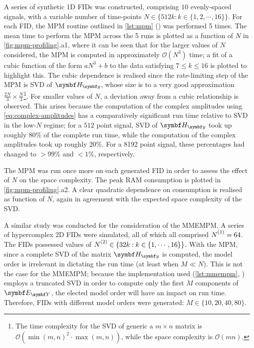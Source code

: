 A series of synthetic \ac{1D} \acp{FID} was constructed, comprising $10$ evenly-spaced
signals, with a
variable number of time-points $N \in \lbrace 512k : k \in \lbrace 1, 2, \cdots, 16 \rbrace \rbrace$.
For each \ac{FID}, the \ac{MPM} routine outlined in \cref{lst:mpm} () was
performed 5 times.
The mean time to perform the \ac{MPM} across the 5 runs is plotted as a function
of $N$ in \cref{fig:mpm-profiling}.a1, where it can be seen that for
the larger values of $N$ considered, the \ac{MPM} is computed in approximately
$\mathcal{O}({N}^3)$ time;
a fit of a cubic function of the form $aN^3 + b$ to the data satisfying $7 \leq
k \leq 16$ is plotted to highlight this.
The cubic dependence is realised since the rate-limiting step of the
\ac{MPM} is \ac{SVD} of $\Hy$, whose size is to a very good approximation
$\tfrac{2N}{3} \times \tfrac{N}{3}$\footnote{
    \label{fn:svd-complexity}
    The time complexity for the \ac{SVD} of generic a $m \times n$ matrix is
    $\mathcal{O}(\operatorname{min}(m, n)^2 \cdot \operatorname{max}(m, n))$,
    while the space complexity is $\mathcal{O}(mn)$.
}. For smaller values of $N$, a deviation
away from a cubic relationship is observed.
This arises because the computation of the complex amplitudes using
\cref{eq:complex-amplitudes} has a comparatively significant run time
relative to \ac{SVD} in the low-$N$ regime;
for a $512$ point signal, \ac{SVD} of $\Hy$ took up roughly 80\% of the
complete run time, while the computation of the complex amplitudes took up
roughly 20\%. For a 8192 point signal, these percentages had changed to
$>\!\!99\%$ and $<\!\!1\%$, respectively.

The \ac{MPM} was run once more on each generated \ac{FID} in order to assess
the effect of $N$ on the space complexity.
The peak \ac{RAM} consumption is plotted in \cref{fig:mpm-profiling}.a2.
A clear quadratic dependence on consumption is realised as function of $N$,
again in agreement with the expected space complexity of the
\ac{SVD}.

A similar study was conducted for the consideration of the \ac{MMEMPM}. A
series of hypercomplex \ac{2D} \acp{FID} were simulated, all of which all
comprised $\None = 64$. The \acp{FID} possessed values of $\Ntwo \in \lbrace
32k : k \in \lbrace 1, \cdots, 16 \rbrace \rbrace$.
With the \ac{MPM}, since a complete \ac{SVD} of the matrix $\Hy$ is computed,
the model order is irrelevant in dictating the run time (at least when $M \ll
N$). This is not the case for the \ac{MMEMPM}; because the \Python
implementation used (\cref{lst:mmempm}, ) employs a
truncated \ac{SVD} in order to compute only the first $M$ components of $\EY$,
the elected model order will have an impact on run time.  Therefore, \acp{FID}
with different model orders were generated: $M \in \lbrace 10, 20, 40, 80
\rbrace$.

